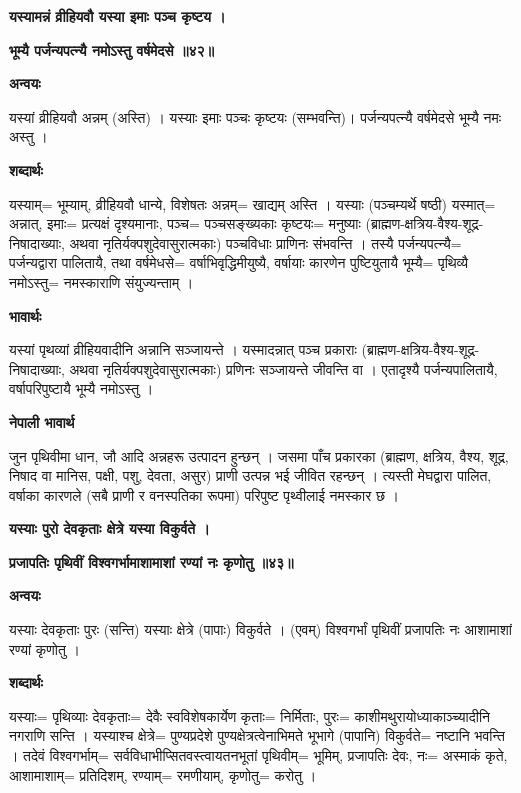 \documentclass[11pt, a5paper]{article}
\begin{document}
\textbf{यस्यामन्नं व्रीहियवौ यस्या इमाः पञ्च कृष्टय ।}

\textbf{भूम्यै पर्जन्यपत्न्यै नमोऽस्तु वर्षमेदसे ॥४२॥}

\textbf{अन्वयः}

यस्यां व्रीहियवौ अन्नम् (अस्ति) । यस्याः इमाः पञ्चः कृष्टयः (सम्भवन्ति)। पर्जन्यपत्न्यै वर्षमेदसे भूम्यै नमः अस्तु ।

\textbf{शब्दार्थः}

यस्याम्= भूम्याम्, व्रीहियवौ धान्ये, विशेषतः अन्नम्= खाद्यम् अस्ति । यस्याः (पञ्चम्यर्थे षष्ठी) यस्मात्= अन्नात्, इमाः= प्रत्यक्षं दृश्यमानाः, पञ्च= पञ्चसङ्‍ख्यकाः कृष्टयः= मनुष्याः (ब्राह्मण-क्षत्रिय-वैश्य-शूद्र-निषादाख्याः, अथवा नृतिर्यक्‍पशुदेवासुरात्मकाः) पञ्चविधाः प्राणिनः संभवन्ति । तस्यै पर्जन्यपत्न्यै= पर्जन्यद्वारा पालितायै, तथा वर्षमेधसे= वर्षाभिवृद्धिमीयुष्यै, वर्षायाः कारणेन पुष्टियुतायै भूम्यै= पृथिव्यै नमोऽस्तु= नमस्काराणि संयुज्यन्ताम् ।

\textbf{भावार्थः}

यस्यां पृथव्यां व्रीहियवादीनि अन्नानि सञ्जायन्ते । यस्मादन्नात् पञ्च प्रकाराः (ब्राह्मण-क्षत्रिय-वैश्य-शूद्र-निषादाख्याः, अथवा नृतिर्यक्‍पशुदेवासुरात्मकाः) प्रणिनः सञ्जायन्ते जीवन्ति वा । एतादृश्यै पर्जन्यपालितायै, वर्षापरिपुष्टायै भूम्यै नमोऽस्तु ।

\textbf{नेपाली भावार्थ}

जुन पृथिवीमा धान, जौ आदि अन्नहरू उत्पादन हुन्छन् । जसमा पाँच प्रकारका (ब्राह्मण, क्षत्रिय, वैश्य, शूद्र, निषाद वा मानिस, पक्षी, पशु, देवता, असुर) प्राणी उत्पन्न भई जीवित रहन्छन् । त्यस्ती मेघद्वारा पालित, वर्षाका कारणले (सबै प्राणी र वनस्पतिका रूपमा) परिपुष्ट पृथ्वीलाई नमस्कार छ ।

\textbf{यस्याः पुरो देवकृताः क्षेत्रे यस्या विकुर्वते ।}

\textbf{प्रजापतिः पृथिवीं विश्वगर्भामाशामाशां रण्यां नः कृणोतु ॥४३॥}

\textbf{अन्वयः}

यस्याः देवकृताः पुरः (सन्ति) यस्याः क्षेत्रे (पापाः) विकुर्वते । (एवम्) विश्वगर्भां पृथिवीं प्रजापतिः नः आशामाशां रण्यां कृणोतु ।

\textbf{शब्दार्थः}

यस्याः= पृथिव्याः देवकृताः= देवैः स्वविशेषकार्येण कृताः= निर्मिताः, पुरः= काशीमथुरायोध्याकाञ्च्यादीनि नगराणि सन्ति । यस्याश्च क्षेत्रे= पुण्यप्रदेशे पुण्यक्षेत्रत्वेनाभिमते भूभागे (पापानि) विकुर्वते= नष्टानि भवन्ति । तदेवं विश्वगर्भाम्= सर्वविधाभीप्सितवस्त्वायतनभूतां पृथिवीम्= भूमिम्, प्रजापतिः देवः, नः= अस्माकं कृते,  आशामाशाम्= प्रतिदिशम्, रण्याम्= रमणीयाम्, कृणोतु= करोतु ।
\end{document}
